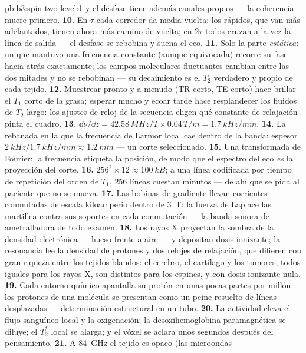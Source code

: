 \begin{solution}{pb:b3:spin-two-level:1}
y el desfase tiene además canales propios --- la coherencia muere
primero.
\textbf{10.} En $\tau$ cada corredor da media vuelta: los rápidos, que van
más adelantados, tienen ahora más camino de vuelta; en $2\tau$ todos
cruzan a la vez la línea de salida --- el desfase se rebobina y suena el
eco.
\textbf{11.} Solo la parte \emph{estática}: un  que mantuvo una
frecuencia constante (aunque equivocada) recorre su fase hacia atrás
exactamente; los campos moleculares fluctuantes cambian entre las dos
mitades y no se rebobinan --- su decaimiento es el $T_2$ verdadero y
propio de cada tejido.
\textbf{12.} Muestrear pronto y a menudo (TR corto, TE corto) hace brillar
el $T_1$ corto de la grasa; esperar mucho y ecoar tarde hace resplandecer
los fluidos de $T_2$ largo: los ajustes de reloj de la secuencia eligen qué
constante de relajación pinta el cuadro.
\textbf{13.} $\dd\nu/\dd z = 42.58\,\unit{MHz/T} \times
0.04\,\unit{T/m} = \qty{1.7}{kHz/mm}$.
\textbf{14.} La rebanada en la que la frecuencia de Larmor local cae dentro
de la banda: espesor $\qty{2}{kHz}/\qty{1.7}{kHz/mm} \approx
\qty{1.2}{mm}$ --- un corte seleccionado.
\textbf{15.} Una transformada de Fourier: la frecuencia etiqueta la
posición, de modo que el espectro del eco \emph{es} la proyección del corte.
\textbf{16.} $256^2 \times 12 \approx \qty{100}{kB}$; a una línea
codificada por tiempo de repetición del orden de $T_1$, $256$ líneas cuestan
minutos --- de ahí que se pida al paciente que no se mueva.
\textbf{17.} Las bobinas de gradiente llevan corrientes conmutadas de escala
kiloamperio dentro de \qty{3}{T}: la fuerza de Laplace las martillea contra
sus soportes en cada conmutación --- la banda sonora de ametralladora de
todo examen.
\textbf{18.} Los rayos X proyectan la sombra de la densidad electrónica ---
hueso frente a aire --- y depositan dosis ionizante; la resonancia lee la
densidad de protones y dos relojes de relajación, que difieren con gran
riqueza entre los tejidos blandos: el cerebro, el cartílago y los tumores,
todos iguales para los rayos X, son distintos para los espines, y con dosis
ionizante nula.
\textbf{19.} Cada entorno químico apantalla su protón en unas pocas partes
por millón: los protones de una molécula se presentan como un peine resuelto
de líneas desplazadas --- determinación estructural en un tubo.
\textbf{20.} La actividad eleva el flujo sanguíneo local y la oxigenación;
la desoxihemoglobina paramagnética se diluye; el $T_2^*$ local se alarga; y
el vóxel se aclara unos segundos después del pensamiento.
\textbf{21.} A \qty{84}{GHz} el tejido es opaco (las microondas

\end{solution}
